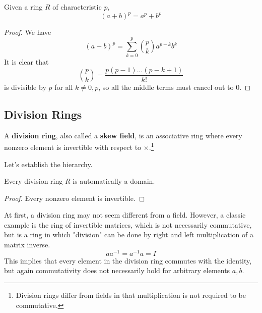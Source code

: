   \begin{corollary}
    Given a ring $R$ of characteristic $p$, 
    \begin{equation}
      (a + b)^p = a^p + b^p
    \end{equation}
  \end{corollary}
  \begin{proof}
    We have 
    \begin{equation}
      (a + b)^p = \sum_{k = 0}^p \binom{p}{k} a^{p-k} b^{k}
    \end{equation}
    It is clear that 
    \begin{equation}
      \binom{p}{k} = \frac{p (p-1) ... (p - k+1)}{k!}
    \end{equation}
    is divisible by $p$ for all $k \neq 0, p$, so all the middle terms must cancel out to $0$. 
  \end{proof}

\subsection{Division Rings}

  \begin{definition}
    A \textbf{division ring}, also called a \textbf{skew field}, is an associative ring where every nonzero element is invertible with respect to $\times$.\footnote{Division rings differ from fields in that multiplication is not required to be commutative. }
  \end{definition}

  Let's establish the hierarchy. 

  \begin{lemma}
    Every division ring $R$ is automatically a domain. 
  \end{lemma}
  \begin{proof}
    Every nonzero element is invertible. 
  \end{proof}

  \begin{example}
    At first, a division ring may not seem different from a field. However, a classic example is the ring of invertible matrices, which is not necessarily commutative, but is a ring in which "division" can be done by right and left multiplication of a matrix inverse. 
    \begin{equation}
      a a^{-1} = a^{-1} a = I
    \end{equation}
    This implies that every element in the division ring commutes with the identity, but again commutativity does not necessarily hold for arbitrary elements $a, b$. 
  \end{example} 

